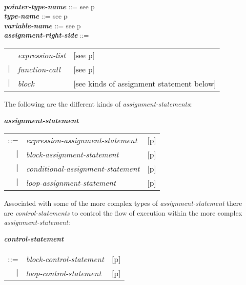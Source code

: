 \documentclass[12pt]{article}
\newcommand{\emkey}[1]{{\em \bfseries #1}}
\newcommand{\pagref}[1]{p\pageref{#1}}
\newenvironment{indpar}[1][0.3in]%
	{\begin{list}{}%
		     {\setlength{\itemsep}{0in}%
		      \setlength{\topsep}{0in}%
		      \setlength{\parsep}{1ex}%
		      \setlength{\labelwidth}{#1}%
		      \setlength{\leftmargin}{#1}%
		      \addtolength{\leftmargin}{\labelsep}}%
	 \item}%
	{\end{list}}
\begin{document}
\begin{indpar}
\\[0.5ex]
\emkey{pointer-type-name} ::= see \pagref{POINTER-TYPE-NAME}
\\[0.5ex]
\emkey{type-name} ::= see \pagref{TYPE-NAME}
\\[0.5ex]
\emkey{variable-name} ::= see \pagref{VARIABLE-NAME}
\\[0.5ex]
\emkey{assignment-right-side}\label{ASSIGNMENT-RIGHT-SIDE} ::= \\
\hspace*{1in}
    \begin{tabular}[t]{@{}rll}
        & {\em expression-list}
    		& [see \pagref{EXPRESSION-LIST}] \\
    $|$ & {\em function-call}
    		& [see \pagref{FUNCTION-CALLS}] \\
    $|$ & {\em block}
	        & [see kinds of assignment statement below] \\
    \end{tabular}
\end{indpar}

The following are the different kinds of {\em assignment-statements}:
\begin{indpar}
\emkey{assignment-statement}
    \begin{tabular}[t]{@{}rll}
    ::= & {\em expression-assignment-statement}
    	& [\pagref{EXPRESSION-ASSIGNMENT-STATEMENTS}] \\
    $|$ & {\em block-assignment-statement}
        & [\pagref{BLOCK-ASSIGNMENT-STATEMENTS}] \\
    $|$ & {\em conditional-assignment-statement}
        & [\pagref{CONDITIONAL-ASSIGNMENT-STATEMENTS}] \\
    $|$ & {\em loop-assignment-statement}
        & [\pagref{LOOP-ASSIGNMENT-STATEMENTS}] \\
    \end{tabular}
\end{indpar}

Associated with some of the more complex types of
{\em assignment-statement} there are {\em control-statements}
to control the flow of execution within the more complex
{\em assignment-statement}:
\begin{indpar}
\emkey{control-statement}\label{CONTROL-STATEMENT}
    \begin{tabular}[t]{@{}rll}
    ::= & {\em block-control-statement}
        & [\pagref{BLOCK-CONTROL-STATEMENTS}] \\
    $|$ & {\em loop-control-statement}
        & [\pagref{LOOP-CONTROL-STATEMENTS}] \\
    \end{tabular}
\end{indpar}
\end{document}
